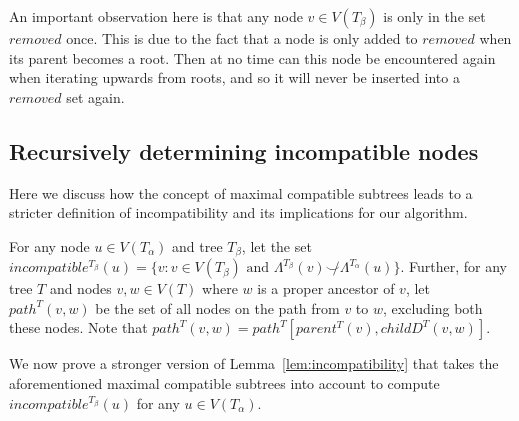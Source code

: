 \documentclass{article}
\newcommand{\compatible}{\smile}
\newcommand{\leafset}{\Lambda}
\newcommand{\TA}{T_\alpha}
\newcommand{\TB}{T_\beta}
\begin{document}

    An important observation here is that any node $v \in V(\TB)$ is only in the set $removed$ once. This is due to the fact that a node is only added to $removed$ when its parent becomes a root. Then at no time can this node be encountered again when iterating upwards from roots, and so it will never be inserted into a $removed$ set again.

    \subsection{Recursively determining incompatible nodes}
    \label{subsec:incompatibilityrecursive}

    Here we discuss how the concept of maximal compatible subtrees leads to a stricter definition of incompatibility and its implications for our algorithm.

    For any node $u \in V(\TA)$ and tree $\TB$, let the set $incompatible^{\TB}(u) = \{v : v \in V(\TB) \text{ and } \leafset^{\TB}(v) \not\compatible \leafset^{\TA}(u)\}$. Further, for any tree $T$ and nodes $v, w \in V(T)$ where $w$ is a proper ancestor of $v$, let $path^T(v, w)$ be the set of all nodes on the path from $v$ to $w$, excluding both these nodes. Note that $path^T(v, w) = path^T[parent^T(v), childD^T(v, w)]$.

    We now prove a stronger version of Lemma~\ref{lem:incompatibility} that takes the aforementioned maximal compatible subtrees into account to compute $incompatible^{\TB}(u)$ for any $u \in V(\TA)$.
    \newline
\end{document}
